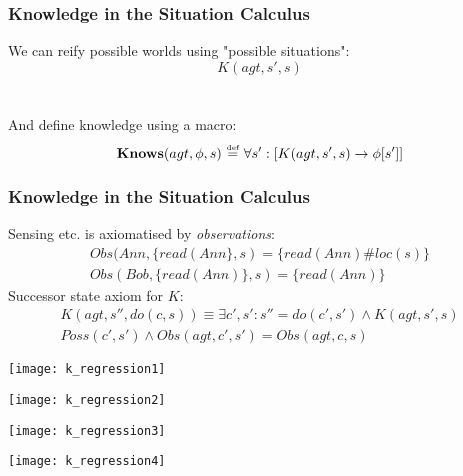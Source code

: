 \documentclass[compress]{beamer}
\newcommand{\isdef}{\hbox{$\stackrel{\mbox{\tiny def}}{=}$}}
\newcommand{\Knows}{\mathbf{Knows}}
\begin{document}
\begin{frame}
\frametitle{Knowledge in the Situation Calculus}
We can reify possible worlds using "possible situations":
\begin{equation*}
 K(agt,s',s)
\end{equation*}
\ \\
\ \\
And define knowledge using a macro:
\begin{equation*}
\Knows(agt,\phi,s)\,\,\isdef\,\,\forall s': \left[ K(agt,s',s) \rightarrow \phi[s']\right]
\end{equation*}
\end{frame}

\begin{frame}
\frametitle{Knowledge in the Situation Calculus}
Sensing etc. is axiomatised by \emph{observations}:
\begin{gather*}
Obs(Ann,\{read(Ann\},s) = \{read(Ann)\#loc(s)\}\\
Obs(Bob,\{read(Ann)\},s) = \{read(Ann)\}
\end{gather*}
\pause
Successor state axiom for $K$:
\begin{multline*}
K(agt,s'',do(c,s)) \equiv \exists c',s': s'' = do(c',s') \wedge K(agt,s',s)\\
  Poss(c',s') \wedge Obs(agt,c',s') = Obs(agt,c,s)
\end{multline*}
\end{frame}

\begin{frame}
\begin{center}
  \texttt{[image: k\_regression1]}
\end{center}
\end{frame}

\begin{frame}
\begin{center}
  \texttt{[image: k\_regression2]}
\end{center}
\end{frame}

\begin{frame}
\begin{center}
  \texttt{[image: k\_regression3]}
\end{center}
\end{frame}

\begin{frame}
\begin{center}
  \texttt{[image: k\_regression4]}
\end{center}
\end{frame}
\end{document}
